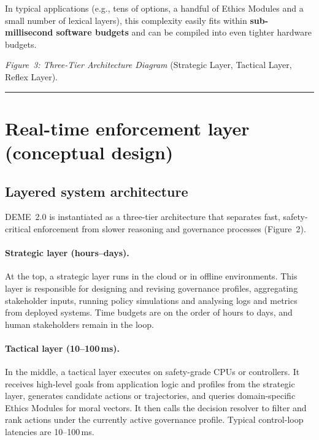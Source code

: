 \documentclass[11pt]{article}
\begin{document}
In typical applications (e.g., tens of options, a handful of Ethics Modules and a small number of lexical layers), this complexity easily fits within \textbf{sub-millisecond software budgets} and can be compiled into even tighter hardware budgets.

\medskip
\noindent\emph{Figure~3: Three-Tier Architecture Diagram} (Strategic Layer, Tactical Layer, Reflex Layer).

\hrule
\vspace{1em}

\section{Real-time enforcement layer (conceptual design)}

\subsection*{Layered system architecture}

DEME~2.0 is instantiated as a three-tier architecture that separates fast, safety-critical enforcement from slower reasoning and governance processes (Figure~2).

\paragraph{Strategic layer (hours--days).}
At the top, a strategic layer runs in the cloud or in offline environments. This layer is responsible for designing and revising governance profiles, aggregating stakeholder inputs, running policy simulations and analysing logs and metrics from deployed systems. Time budgets are on the order of hours to days, and human stakeholders remain in the loop.

\paragraph{Tactical layer (10--100\,ms).}
In the middle, a tactical layer executes on safety-grade CPUs or controllers. It receives high-level goals from application logic and profiles from the strategic layer, generates candidate actions or trajectories, and queries domain-specific Ethics Modules for moral vectors. It then calls the decision resolver to filter and rank actions under the currently active governance profile. Typical control-loop latencies are 10--100\,ms.
\end{document}
